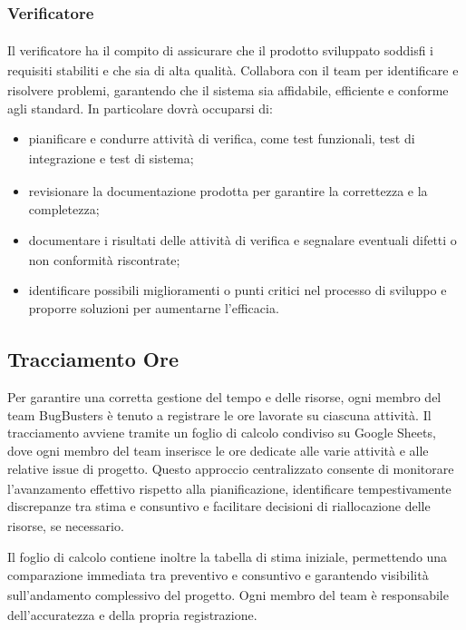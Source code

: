 \documentclass[a4paper,11pt]{article}
\newcommand{\G}{\textsubscript{\scalebox{0.6}{\textbf{G}}}}
\begin{document}
\subsubsection{Verificatore\G{}}
Il verificatore\G{} ha il compito di assicurare che il prodotto\G{} sviluppato soddisfi i requisiti\G{}
stabiliti e che sia di alta qualità\G{}. Collabora con il team per identificare e risolvere
problemi, garantendo che il sistema sia affidabile, efficiente e conforme agli standard.
In particolare dovrà occuparsi di:
\begin{itemize}
    \item pianificare e condurre attività di verifica\G{}, come test\G{} funzionali, test\G{} di integrazione e test\G{} di sistema;
    \item revisionare la documentazione prodotta per garantire la correttezza e la completezza;
    \item documentare i risultati delle attività di verifica\G{} e segnalare eventuali difetti
    o non conformità riscontrate;
    \item identificare possibili miglioramenti o punti critici nel processo di sviluppo e proporre soluzioni per
    aumentarne l'efficacia\G{}.
\end{itemize}

\subsection{Tracciamento Ore}
Per garantire una corretta gestione del tempo e delle risorse, ogni 
membro del team BugBusters è tenuto a registrare le ore lavorate su 
ciascuna attività. Il tracciamento avviene tramite un foglio di 
calcolo condiviso su Google Sheets, dove ogni membro del team 
inserisce le ore dedicate alle varie attività e alle relative 
issue\G{} di progetto\G{}. Questo approccio centralizzato consente di 
monitorare l'avanzamento effettivo rispetto alla pianificazione, 
identificare tempestivamente discrepanze tra stima e consuntivo\G{} e 
facilitare decisioni di riallocazione delle risorse, se necessario.

Il foglio di calcolo contiene inoltre la tabella di stima iniziale, 
permettendo una comparazione immediata tra preventivo\G{} e consuntivo\G{} 
e garantendo visibilità sull'andamento complessivo del progetto\G{}. 
Ogni membro del team è responsabile\G{} dell'accuratezza e della propria registrazione.
\end{document}
